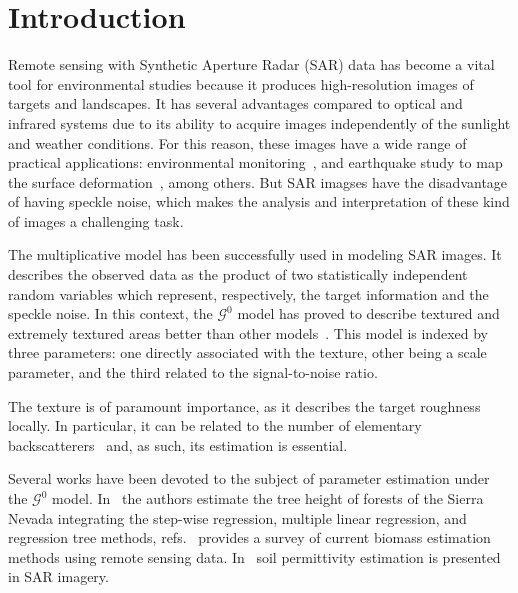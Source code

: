 \documentclass[twocolumn]{svjour3}
\begin{document}
\section{Introduction}
\label{intro}

Remote sensing with Synthetic Aperture Radar (SAR) data has become a vital tool for environmental studies because it produces high-resolution images of targets and landscapes. 
It  has  several  advantages  compared  to  optical  and  infrared systems due to its ability to acquire images independently of the sunlight and weather conditions. 
For this reason, these images have a wide range of practical applications: environmental monitoring~\cite{White1991,Brisco2013}, and
earthquake study to map the surface deformation~\cite{Yinghui2017}, among others.  
But SAR imagses have the disadvantage of having speckle noise, which makes the analysis and interpretation of these kind of images a challenging task.

The multiplicative model has been successfully used in modeling SAR images.
It describes the observed data as the product of two statistically independent random variables which represent, respectively, the target information and the speckle noise. 
In this context, the $\mathcal{G}^0$ model has proved to describe textured and extremely textured areas better than other models~\cite{Frery97,MejailJacoboFreryBustos:IJRS}. 
This model is indexed by three parameters: 
one directly associated with the texture, 
other being a scale parameter, 
and the third related to the signal-to-noise ratio.

The texture is of paramount importance, as it describes the target roughness locally.
In particular, it can be related to the number of elementary backscatterers~\cite{AGeneralizedGaussianCoherentScattererModelforCorrelatedSARTexture} and, as such, its estimation is essential.

Several works have been devoted to the subject of parameter estimation under the $\mathcal{G}^0$ model. 
In~\cite{Su2016} the authors estimate the tree height of forests of the Sierra Nevada integrating the step-wise regression, multiple linear regression, and regression tree methods, refs.~\cite{Lu2016} provides a survey of current biomass estimation methods using remote sensing data. In~\cite{AlvarezLopez2017} soil permittivity estimation is presented in SAR imagery.
\end{document}
